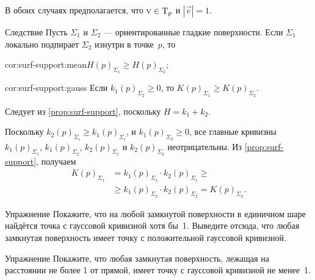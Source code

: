 В обоих случаях предполагается, что $\text{\sc{v}}\in\mathrm{T}_p$ и $|\vec v|=1$.\qeds



\begin{thm}{Следствие}\label{cor:surf-support}
Пусть $\Sigma_1$ и $\Sigma_2$ --- ориентированные гладкие поверхности.
Если $\Sigma_1$ локально подпирает $\Sigma_2$ изнутри в точке~$p$, то

\begin{subthm}{cor:surf-support:mean}$H(p)_{\Sigma_1}\ge H(p)_{\Sigma_2}$;
\end{subthm}

\begin{subthm}{cor:surf-support:gauss} Если $k_1(p)_{\Sigma_2}\ge 0$, то $K(p)_{\Sigma_1}\ge K(p)_{\Sigma_2}$.
\end{subthm}
 
\end{thm}



Следует из \ref{prop:surf-support}, поскольку $H=k_1+k_2$. 



Поскольку $k_2(p)_{\Sigma_i}\ge k_1(p)_{\Sigma_i}$, и $k_1(p)_{\Sigma_2}\ge 0$, все главные кривизны 
$k_1(p)_{\Sigma_1}$, 
$k_1(p)_{\Sigma_2}$, 
$k_2(p)_{\Sigma_1}$ и 
$k_2(p)_{\Sigma_2}$ неотрицательны.
Из \ref{prop:surf-support}, получаем
\begin{align*}
K(p)_{\Sigma_1}&=k_1(p)_{\Sigma_1}\cdot k_2(p)_{\Sigma_1}\ge 
\\
&\ge k_1(p)_{\Sigma_2}\cdot k_2(p)_{\Sigma_2}=K(p)_{\Sigma_2}.
\end{align*}
\qedsf

\begin{thm}{Упражнение}\label{ex:positive-gauss-0}
Покажите, что на любой замкнутой поверхности в единичном шаре найдётся точка с гауссовой кривизной хотя бы~1.
Выведите отсюда, что любая замкнутая поверхность имеет точку с положительной гауссовой кривизной.
\end{thm}

{\sloppy

\begin{thm}{Упражнение}\label{ex:positive-gauss}
Покажите, что любая замкнутая поверхность, лежащая на расстоянии не более 1 от прямой, имеет точку с гауссовой кривизной не менее~1.
\end{thm}

}

